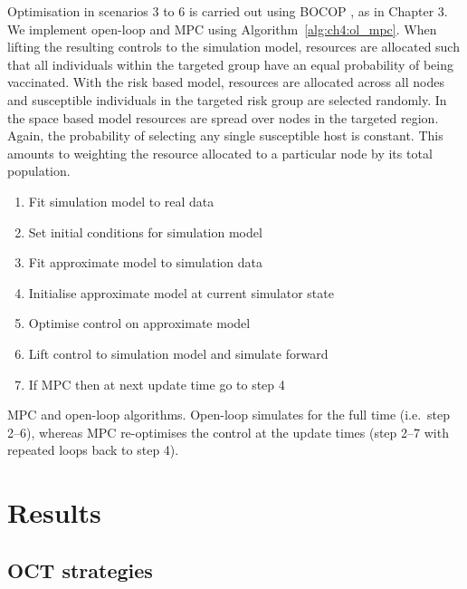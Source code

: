 Optimisation in scenarios 3 to 6 is carried out using BOCOP \citep{bocop}, as in Chapter 3. We implement open-loop and MPC using Algorithm~\ref{alg:ch4:ol_mpc}. When lifting the resulting controls to the simulation model, resources are allocated such that all individuals within the targeted group have an equal probability of being vaccinated. With the risk based model, resources are allocated across all nodes and susceptible individuals in the targeted risk group are selected randomly. In the space based model resources are spread over nodes in the targeted region. Again, the probability of selecting any single susceptible host is constant. This amounts to weighting the resource allocated to a particular node by its total population.
 
\begin{algorithm}[H]
    \begin{enumerate}
        \item{}Fit simulation model to real data
        \item{}Set initial conditions for simulation model
        \item{}Fit approximate model to simulation data
        \item{}Initialise approximate model at current simulator state
        \item{}Optimise control on approximate model
        \item{}Lift control to simulation model and simulate forward
        \item{}If MPC then at next update time go to step 4
    \end{enumerate}
\caption{MPC and open-loop algorithms. Open-loop simulates for the full time (i.e.\ step 2--6), whereas MPC re-optimises the control at the update times (step 2--7 with repeated loops back to step 4).\label{alg:ch4:ol_mpc}}
\end{algorithm}

\FloatBarrier

\section{Results}
\label{sec:ch4:Results}

\subsection{OCT strategies}

